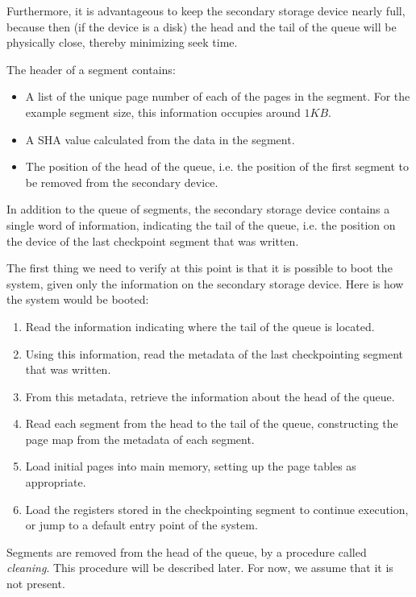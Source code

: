 Furthermore, it is advantageous to keep the secondary storage device
nearly full, because then (if the device is a disk) the head and the
tail of the queue will be physically close, thereby minimizing seek
time.

The header of a segment contains:

\begin{itemize}
\item A list of the unique page number of each of the pages in the
  segment.  For the example segment size, this information occupies
  around $1KB$.
\item A SHA value calculated from the data in the segment.
\item The position of the head of the queue, i.e. the position of the
  first segment to be removed from the secondary device.
\end{itemize}

In addition to the queue of segments, the secondary storage device
contains a single word of information, indicating the tail of the
queue, i.e. the position on the device of the last checkpoint segment
that was written.

The first thing we need to verify at this point is that it is possible
to boot the system, given only the information on the secondary
storage device.  Here is how the system would be booted:

\begin{enumerate}
\item Read the information indicating where the tail of the queue is
  located.
\item Using this information, read the metadata of the last
  checkpointing segment that was written.
\item From this metadata, retrieve the information about the head of
  the queue.
\item Read each segment from the head to the tail of the queue,
  constructing the page map from the metadata of each segment.
\item Load initial pages into main memory, setting up the page tables
  as appropriate.
\item Load the registers stored in the checkpointing segment to
  continue execution, or jump to a default entry point of the system.
\end{enumerate}

Segments are removed from the head of the queue, by a procedure called
\emph{cleaning}.  This procedure will be described later.  For now, we
assume that it is not present.

